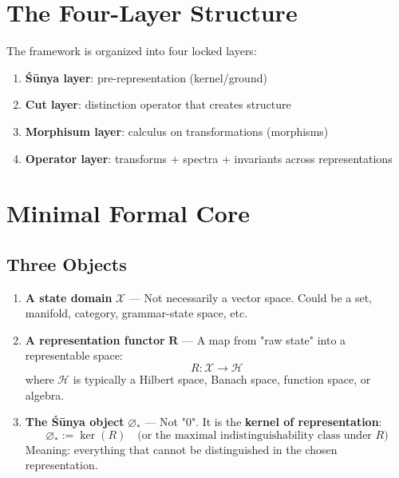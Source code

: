 \documentclass[12pt, oneside]{article}
\begin{document}
\section{The Four-Layer Structure}

The framework is organized into four locked layers:

\begin{enumerate}
    \item \textbf{Śūnya layer}: pre-representation (kernel/ground)
    \item \textbf{Cut layer}: distinction operator that creates structure
    \item \textbf{Morphisum layer}: calculus on transformations (morphisms)
    \item \textbf{Operator layer}: transforms + spectra + invariants across representations
\end{enumerate}

\section{Minimal Formal Core}

\subsection{Three Objects}

\begin{enumerate}
    \item \textbf{A state domain} $\mathcal{X}$ — Not necessarily a vector space. Could be a set, manifold, category, grammar-state space, etc.
    
    \item \textbf{A representation functor} $\mathbf{R}$ — A map from "raw state" into a representable space:
    \begin{equation}
    R: \mathcal{X} \rightarrow \mathcal{H}
    \end{equation}
    where $\mathcal{H}$ is typically a Hilbert space, Banach space, function space, or algebra.
    
    \item \textbf{The Śūnya object} $\varnothing_*$ — Not "0". It is the \textbf{kernel of representation}:
    \begin{equation}
    \varnothing_* := \ker(R) \quad \text{(or the maximal indistinguishability class under }R\text{)}
    \end{equation}
    Meaning: everything that cannot be distinguished in the chosen representation.
\end{enumerate}
\end{document}
